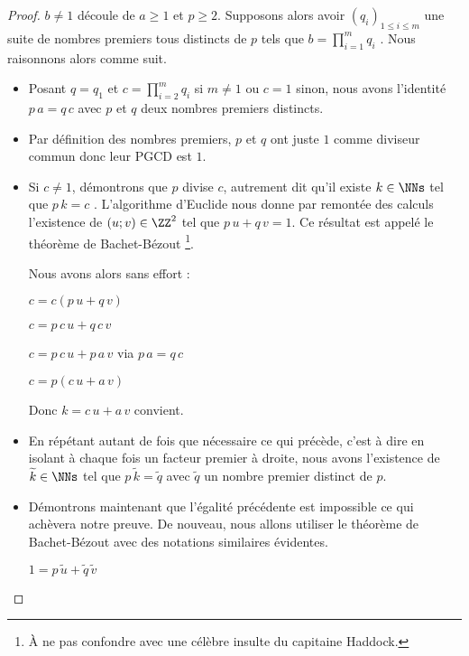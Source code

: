 \begin{proof}
	$b \neq 1$ découle de $a \geq 1$ et $p \geq 2$. 
	Supposons alors avoir $(q_i)_{1 \leq i \leq m}$ une suite de nombres premiers tous distincts de $p$ tels que $\displaystyle b = \prod_{i=1}^{m} q_i$ .
	Nous raisonnons alors comme suit.
	\begin{itemize}[label=\small\textbullet]
		\item Posant $q = q_1$ et $\displaystyle c = \prod_{i=2}^{m} q_i$ si $m \neq 1$ ou $c=1$ sinon, nous avons l'identité $p \, a = q \, c$ avec $p$ et $q$ deux nombres premiers distincts.
		
		
		\item Par définition des nombres premiers, $p$ et $q$ ont juste $1$ comme diviseur commun donc leur PGCD est $1$.

	
		\item Si $c \neq 1$, démontrons que $p$ divise $c$, autrement dit qu'il existe $k \in \NNs$ tel que $p \, k = c$ .
		L'algorithme d'Euclide nous donne par remontée des calculs l'existence de $(u ; v) \in \ZZ^2$ tel que $p \, u + q \, v = 1$. Ce résultat est appelé le théorème de Bachet-Bézout
		\footnote{
			À ne pas confondre avec une célèbre insulte du capitaine Haddock.
		}.
		
		\smallskip
		\noindent
		Nous avons alors sans effort :
		
		\smallskip
		\noindent
		$c = c(p \, u + q \, v)$
		
		\smallskip
		\noindent
		$c = p \, c \, u + q \, c \, v$
		
		\smallskip
		\noindent
		$c = p \, c \, u + p \, a \, v$ via $p \, a = q \, c$
		
		\smallskip
		\noindent
		$c = p(c \, u + a \, v)$
		
		\smallskip
		\noindent
		Donc $k = c \, u + a \, v$ convient.
		
		
		\item En répétant autant de fois que nécessaire ce qui précède, c'est à dire en isolant à chaque fois un facteur premier à droite, nous avons l'existence de $\widetilde{k} \in \NNs$ tel que $p \, \widetilde{k} = \widetilde{q}$ avec $\widetilde{q}$ un nombre premier distinct de $p$.

	
		\item Démontrons maintenant que l'égalité précédente est impossible ce qui achèvera notre preuve. De nouveau, nous allons utiliser le théorème de Bachet-Bézout avec des notations similaires évidentes.
		
		\smallskip
		\noindent
		$1 = p \, \widetilde{u} + \widetilde{q} \, \widetilde{v}$
		

\end{itemize}
\end{proof}
